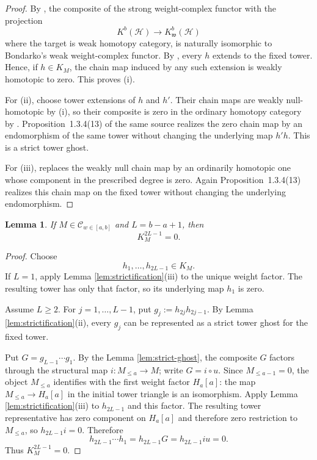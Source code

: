 \documentclass[11pt]{amsart}
\numberwithin{equation}{section}
\newtheorem{lemma}[theorem]{Lemma}
\theoremstyle{definition}
\theoremstyle{remark}
\newcommand{\C}{\mathcal C}
\newcommand{\Hh}{\mathcal H}
\begin{document}
\begin{proof}
By \cite[Corollary~3.5]{Sosnilo}, the composite of the strong weight-complex
functor with the projection
\[
  K^b(\Hh)\longrightarrow K^b_{\mathfrak w}(\Hh)
\]
where the target is weak homotopy category, is naturally
isomorphic to Bondarko's weak weight-complex functor.  By
\cite[Proposition~1.3.4(2)]{BondarkoWeightComplexes}, every $h$ extends to
the fixed tower.  Hence, if $h\in K_M$, the chain map induced by any such
extension is weakly homotopic to zero.  This proves (i).

For (ii), choose tower extensions of $h$ and $h'$.  Their chain maps are
weakly null-homotopic by (i), so their composite is zero in the ordinary
homotopy category by
\cite[Proposition~B.2(4)]{BondarkoWeightComplexes}.  Proposition~1.3.4(13)
of the same source realizes the zero chain map by an endomorphism of the same
tower without changing the underlying map $h'h$.  This is a strict tower
ghost.

For (iii), \cite[Proposition~B.2(1),(2)]{BondarkoWeightComplexes} replaces
the weakly null chain map by an ordinarily homotopic one whose component in
the prescribed degree is zero.  Again Proposition~1.3.4(13) realizes this
chain map on the fixed tower without changing the underlying endomorphism.
\end{proof}

\begin{lemma}
\label{lem:strong-kernel}
If $M\in\C_{w\in[a,b]}$ and $L=b-a+1$, then
\[
  K_M^{2L-1}=0.
\]
\end{lemma}

\begin{proof}
Choose
\[
  h_1,\ldots,h_{2L-1}\in K_M.
\]
If $L=1$, apply Lemma \ref{lem:strictification}(iii) to the unique weight factor.
The resulting tower has only that factor, so its underlying map $h_1$ is
zero.

Assume $L\ge2$.  For $j=1,\ldots,L-1$, put $g_j:=h_{2j}h_{2j-1}.$
By Lemma \ref{lem:strictification}(ii), every $g_j$ can be represented as a strict
tower ghost for the fixed tower.

Put $G=g_{L-1}\cdots g_1$.  By the  Lemma 
\ref{lem:strict-ghost}, the composite $G$
factors through the structural map $i\colon M_{\le a}\to M$; write
$G=i\circ u$.  Since $M_{\le a-1}=0$, the object $M_{\le a}$ identifies
with the first weight factor $H_a[a]$: the map
$M_{\le a}\to H_a[a]$ in the initial tower triangle is an isomorphism.  Apply Lemma 
\ref{lem:strictification}(iii) to $h_{2L-1}$ and this factor.  The resulting
tower representative has zero component on $H_a[a]$ and therefore zero
restriction to $M_{\le a}$, so
$h_{2L-1}i=0$.  Therefore
\[
  h_{2L-1}\cdots h_1=h_{2L-1}G=h_{2L-1}iu=0.
\]
Thus $K_M^{2L-1}=0$.
\end{proof}
\end{document}

